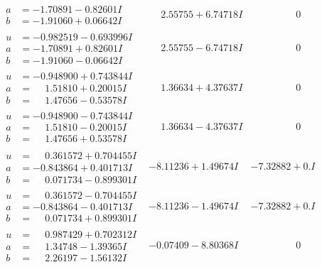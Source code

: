 \documentclass[1p]{elsarticle_modified}
\theoremstyle{definition}
\begin{document}
$$\begin{array}{c|c|c}
\begin{aligned}
a &= -1.70891 - 0.82601 I \\
b &= -1.91060 + 0.06642 I\end{aligned}
 & \phantom{-}2.55755 + 6.74718 I & \phantom{-0.000000 } 0 \\ \hline\begin{aligned}
u &= -0.982519 - 0.693996 I \\
a &= -1.70891 + 0.82601 I \\
b &= -1.91060 - 0.06642 I\end{aligned}
 & \phantom{-}2.55755 - 6.74718 I & \phantom{-0.000000 } 0 \\ \hline\begin{aligned}
u &= -0.948900 + 0.743844 I \\
a &= \phantom{-}1.51810 + 0.20015 I \\
b &= \phantom{-}1.47656 - 0.53578 I\end{aligned}
 & \phantom{-}1.36634 + 4.37637 I & \phantom{-0.000000 } 0 \\ \hline\begin{aligned}
u &= -0.948900 - 0.743844 I \\
a &= \phantom{-}1.51810 - 0.20015 I \\
b &= \phantom{-}1.47656 + 0.53578 I\end{aligned}
 & \phantom{-}1.36634 - 4.37637 I & \phantom{-0.000000 } 0 \\ \hline\begin{aligned}
u &= \phantom{-}0.361572 + 0.704455 I \\
a &= -0.843864 + 0.401713 I \\
b &= \phantom{-}0.071734 - 0.899301 I\end{aligned}
 & -8.11236 + 1.49674 I & -7.32882 + 0. I\phantom{ +0.000000I} \\ \hline\begin{aligned}
u &= \phantom{-}0.361572 - 0.704455 I \\
a &= -0.843864 - 0.401713 I \\
b &= \phantom{-}0.071734 + 0.899301 I\end{aligned}
 & -8.11236 - 1.49674 I & -7.32882 + 0. I\phantom{ +0.000000I} \\ \hline\begin{aligned}
u &= \phantom{-}0.987429 + 0.702312 I \\
a &= \phantom{-}1.34748 - 1.39365 I \\
b &= \phantom{-}2.26197 - 1.56132 I\end{aligned}
 & -0.07409 - 8.80368 I & \phantom{-0.000000 } 0\\

\end{array}$$
\end{document}

